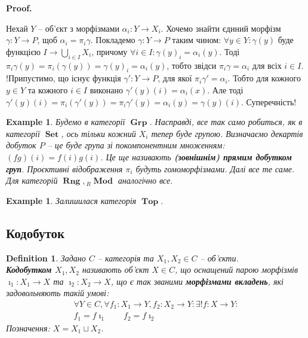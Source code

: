 \documentclass[a4paper, 10pt]{article}
\makeatletter
\theoremstyle{theoremdd}
\newtheorem{definition}[theorem]{Definition}
\newtheorem{example}[theorem]{Example}
\renewenvironment{proof}[1][Proof.\\]{\par
\pushQED{\hfill \qed}%
\normalfont \topsep6\p@\@plus6\p@\relax
\trivlist
\item\relax
{\bfseries
#1\@addpunct{.}}\hspace\labelsep\ignorespaces
}{%
\popQED\endtrivlist\@endpefalse
}
\DeclareMathOperator{\Set}{\textbf{Set}}
\DeclareMathOperator{\Grp}{\textbf{Grp}}
\DeclareMathOperator{\Rng}{\textbf{Rng}}
\DeclareMathOperator{\Top}{\textbf{Top}}
\DeclareMathOperator{\Mod}{\textbf{Mod}}
\makeatother
\begin{document}
\begin{proof}
Нехай $Y$ -- об'єкт з морфізмами $\alpha_i \colon Y \to X_i$. Хочемо знайти єдиний морфізм $\gamma \colon Y \to P$, щоб $\alpha_i = \pi_i \gamma$. Покладемо $\gamma \colon Y \to P$ таким чином: $\forall y \in Y: \gamma(y)$ буде функцією $I \to \displaystyle\bigcup_{i \in I} X_i$, причому $\forall i \in I: \gamma(y)_i = \alpha_i(y)$. Тоді $\pi_i \gamma(y) = \pi_i(\gamma(y)) = \gamma(y)_i = \alpha_i(y)$, тобто звідси $\pi_i \gamma = \alpha_i$ для всіх $i \in I$.\\
!Припустимо, що існує функція $\gamma' \colon Y \to P$, для якої $\pi_i \gamma' = \alpha_i$. Тобто для кожного $y \in Y$ та кожного $i \in I$ виконано $\gamma'(y)(i) = \alpha_i(x)$. Але тоді\\
$\gamma'(y)(i) = \pi_i(\gamma'(y)) = \pi_i \gamma'(y) = \alpha_i(y) = \gamma(y)(i)$. Суперечність!
\end{proof}

\begin{example}
Будемо в категорії $\Grp$. Насправді, все так само робиться, як в категорії $\Set$, ось тільки кожний $X_i$ тепер буде групою. Визначаємо декартів добуток $P$ -- це буде група зі покомпонентним множенням: $(fg)(i) = f(i)g(i)$. Це ще називають \textbf{(зовнішнім) прямим добутком груп}. Проєктивні відображення $\pi_i$ будуть гомоморфізмами. Далі все те саме.
\bigskip \\
Для категорій $\Rng, {}_R \Mod$ аналогічно все.
\end{example}

\begin{example}
Залишилася категорія $\Top$.
\end{example}

\subsection{Кодобуток}
\begin{definition}
Задано $C$ -- категорія та $X_1,X_2 \in C$ -- об'єкти.\\
\textbf{Кодобутком $X_1,X_2$} називають об'єкт $X \in C$, що оснащений парою морфізмів $\imath_1 \colon X_1 \to X$ та $\imath_2 \colon X_2 \to X$, що є так званими \textbf{морфізмами вкладень}, які задовольняють такій умові:
\begin{align*}
\forall Y \in C, \forall f_1 \colon X_1 \to Y, f_2 \colon X_2 \to Y: \exists ! f \colon X \to Y: \\
f_1 = f \imath_1 \qquad f_2 = f \imath_2
\end{align*}
Позначення: $X = X_1 \sqcup X_2$.
\begin{figure}[H]
\centering
{}
\end{figure}
\end{definition}
\end{document}
